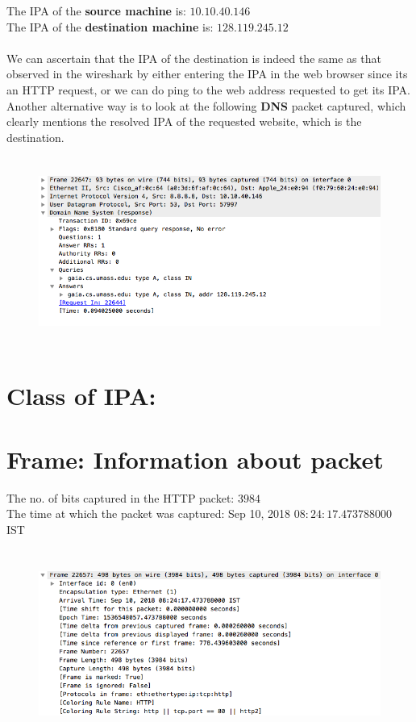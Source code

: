 \documentclass[]{report}
\begin{document}
The IPA of the \textbf{source machine} is: $10.10.40.146$ 
\\
The IPA of the \textbf{destination machine} is: $128.119.245.12$
\\ \\
We can ascertain that the IPA of the destination is indeed the same as that observed in the wireshark by either entering the IPA in the web browser since its an HTTP request, or we can do ping to the web address requested to get its IPA. \\
Another alternative way is to look at the following \textbf{DNS} packet captured, which clearly mentions the resolved IPA of the requested website, which is the destination.
\begin{figure}[H]
	\vspace{0pt}
	\includegraphics[height = 175pt, keepaspectratio]{Snapshots/q4_2.png}
\end{figure}

\section{Class of IPA:}


\section{Frame: Information about packet}
The no. of bits captured in the HTTP packet: $3984$ 
\\
The time at which the packet was captured: Sep 10, 2018 $08:24:17.473788000$ IST
\begin{figure}[H]
	\vspace{0pt}
	\includegraphics[height = 175pt, keepaspectratio]{Snapshots/q6.png}
\end{figure}
\end{document}
